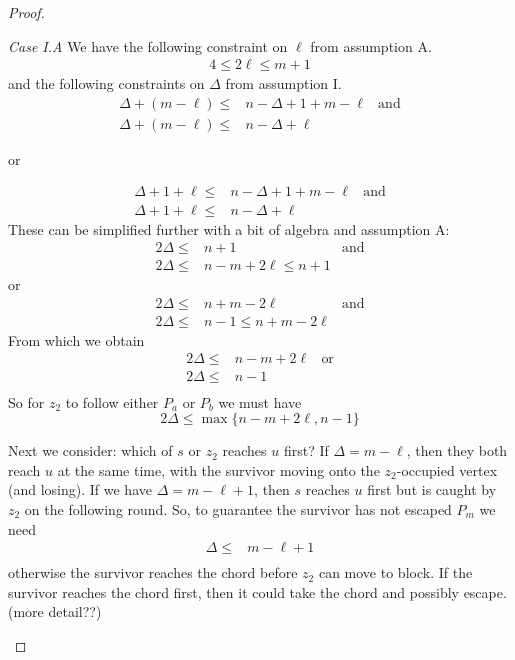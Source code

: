 \documentclass[letterpaper, 10pt]{article}
\begin{document}
\begin{proof}
\begin{proofpart}
\textit{Case I.A} We have the following constraint on $\ell$ from
assumption A.
\begin{align*}
  4 \leq 2 \ell \leq m + 1
\end{align*}
and the following constraints on $\Delta$ from assumption I.
\begin{align*}
  \Delta + (m - \ell) \leq & n - \Delta + 1 + m - \ell & \text{and}\\
 \Delta + (m - \ell) \leq & n - \Delta + \ell
\end{align*}
\begin{center}or\end{center}
\begin{align*}
\Delta + 1 + \ell \leq &n - \Delta + 1 + m - \ell & \text{and} \\
 \Delta + 1 + \ell \leq & n - \Delta + \ell
\end{align*}
These can be simplified further with a bit of algebra and  assumption A:
\begin{align*}
2 \Delta \leq & n+1 & \text{and} \\
2 \Delta \leq & n - m + 2\ell \leq n+1
\end{align*}
or
\begin{align*}
2 \Delta \leq & n+m -2 \ell & \text{and} \\
2 \Delta \leq & n -1 \leq n + m - 2\ell
\end{align*}
From which we obtain
\begin{align*}
2 \Delta \leq & n - m + 2\ell & \text{or} \\
2 \Delta \leq & n - 1 \\
\end{align*}
So for $z_2$ to follow either $P_a$ or $P_b$ we must have
\[ 2 \Delta \leq \max \{ n - m +2\ell, n -1 \} \]

Next we consider: which of $s$ or $z_2$ reaches $u$ first?
If $\Delta = m - \ell$, then they both reach $u$ at the same time, with the survivor moving onto the $z_2$-occupied vertex (and losing).
If we have $\Delta = m - \ell + 1$, then $s$ reaches $u$ first
but is caught by $z_2$ on the following round.
So, to guarantee the survivor has not escaped $P_m$ we need
\begin{align*}
  \Delta \leq & m- \ell + 1\\
\end{align*}
otherwise the survivor reaches the chord before $z_2$ can move
to block. If the survivor reaches the chord first, then it could
take the chord and possibly escape. (more detail??)


\end{proofpart}
\end{proof}
\end{document}
